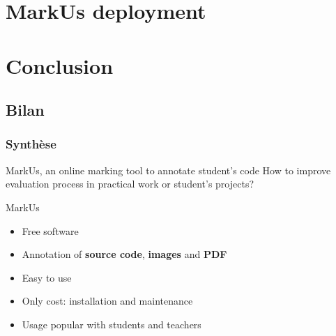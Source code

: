 \documentclass[svgnames,hyperref, english, xcolor=dvipsnames,usenames]{beamer}					      %
\begin{document}
\section{MarkUs deployment}



\section{Conclusion}


\subsection*{Bilan}

\frame
{
        \frametitle{Synthèse}

        \begin{alertblock}{MarkUs, an online marking tool to annotate student's code}
                How to improve evaluation process in practical work or student's projects?
        \end{alertblock}

        \begin{block}{MarkUs}
                \begin{itemize}
                        \item Free software
                        \item Annotation of \textbf{source code}, \textbf{images} and \textbf{PDF}
                        \item Easy to use
                        \item Only cost: installation and maintenance
                        \item Usage popular with students and teachers
                \end{itemize}
        \end{block}
}
\end{document}
